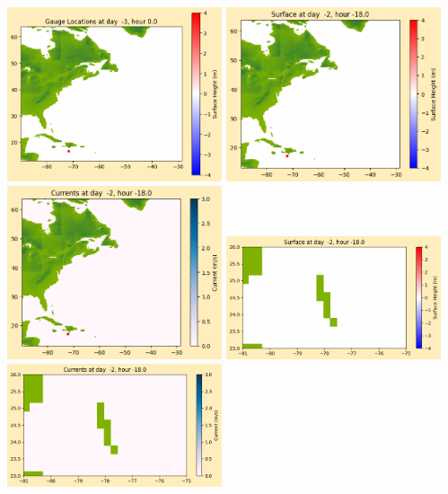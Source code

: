 \documentclass[11pt]{article}
\begin{document}
\includegraphics[width=0.475\textwidth]{frame0000fig1014.png}
\vskip 10pt 
\includegraphics[width=0.475\textwidth]{frame0001fig1001.png}
\includegraphics[width=0.475\textwidth]{frame0001fig1002.png}
\vskip 10pt 
\includegraphics[width=0.475\textwidth]{frame0001fig1003.png}
\includegraphics[width=0.475\textwidth]{frame0001fig1004.png}
\end{document}
